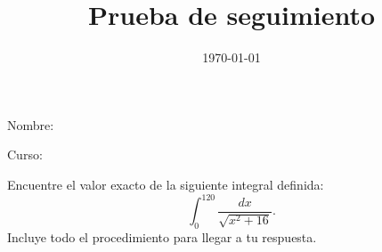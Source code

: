 \documentclass[12pt,a4paper]{article}
\title{Prueba de seguimiento}
\date{\today}
\begin{document}

\maketitle

Nombre:

Curso:

\hrulefill

Encuentre el valor exacto de la siguiente integral definida:
\[ \int_0^{120} \dfrac{dx}{\sqrt{x^2 + 16}}.\]
Incluye todo el procedimiento para llegar a tu respuesta.
\end{document}
